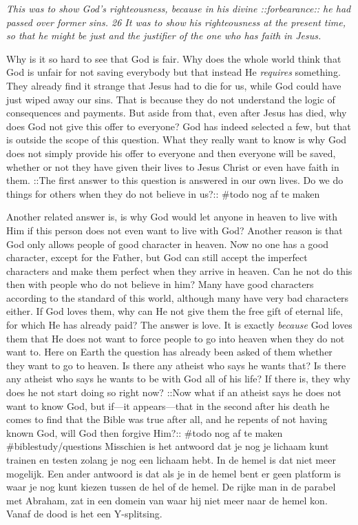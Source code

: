 \emph{This was to show God's righteousness, because in his divine
::forbearance:: he had passed over former sins. 26 It was to show his
righteousness at the present time, so that he might be just and the
justifier of the one who has faith in Jesus.}

Why is it so hard to see that God is fair. Why does the whole world
think that God is unfair for not saving everybody but that instead He
\emph{requires} something. They already find it strange that Jesus had
to die for us, while God could have just wiped away our sins. That is
because they do not understand the logic of consequences and payments.
But aside from that, even after Jesus has died, why does God not give
this offer to everyone? God has indeed selected a few, but that is
outside the scope of this question. What they really want to know is why
God does not simply provide his offer to everyone and then everyone will
be saved, whether or not they have given their lives to Jesus Christ or
even have faith in them. ::The first answer to this question is answered
in our own lives. Do we do things for others when they do not believe in
us?:: \#todo nog af te maken

Another related answer is, is why God would let anyone in heaven to live
with Him if this person does not even want to live with God? Another
reason is that God only allows people of good character in heaven. Now
no one has a good character, except for the Father, but God can still
accept the imperfect characters and make them perfect when they arrive
in heaven. Can he not do this then with people who do not believe in
him? Many have good characters according to the standard of this world,
although many have very bad characters either. If God loves them, why
can He not give them the free gift of eternal life, for which He has
already paid? The answer is love. It is exactly \emph{because} God loves
them that He does not want to force people to go into heaven when they
do not want to. Here on Earth the question has already been asked of
them whether they want to go to heaven. Is there any atheist who says he
wants that? Is there any atheist who says he wants to be with God all of
his life? If there is, they why does he not start doing so right now?
::Now what if an atheist says he does not want to know God, but if---it
appears---that in the second after his death he comes to find that the
Bible was true after all, and he repents of not having known God, will
God then forgive Him?:: \#todo nog af te maken \#biblestudy/questions
Misschien is het antwoord dat je nog je lichaam kunt trainen en testen
zolang je nog een lichaam hebt. In de hemel is dat niet meer mogelijk.
Een ander antwoord is dat als je in de hemel bent er geen platform is
waar je nog kunt kiezen tussen de hel of de hemel. De rijke man in de
parabel met Abraham, zat in een domein van waar hij niet meer naar de
hemel kon. Vanaf de dood is het een Y-splitsing.

